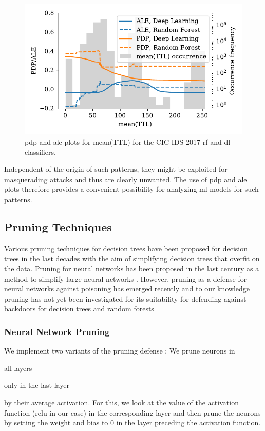 \documentclass[10pt,sigconf,letterpaper,dvipsnames]{acmart}
\begin{document}
\begin{figure}[b]
\includegraphics[width=\columnwidth]{figures/ttlmean.pdf}
\caption{\gls{pdp} and \gls{ale} plots for mean(TTL) for the CIC-IDS-2017 \gls{rf} and \gls{dl} classifiers.}
\label{fig:ttlmean}
\end{figure}
Independent of the origin of such patterns, they might be exploited for masquerading attacks and thus are clearly unwanted. The use of \gls{pdp} and \gls{ale} plots therefore provides a convenient possibility for analyzing \gls{ml} models for such patterns.
\subsection{Pruning Techniques}

Various pruning techniques for decision trees have been proposed for decision trees in the last decades \cite{esposito_comparative_1997} with the aim of simplifying decision trees that overfit on the data. Pruning for neural networks has been proposed in the last century as a method to simplify large neural networks \cite{sietsma_neural_1988}. However, pruning as a defense for neural networks against poisoning has emerged recently \cite{gu_badnets:_2017} and to our knowledge pruning has not yet been investigated for its suitability for defending against backdoors for decision trees and random forests

\subsubsection{Neural Network Pruning}

We implement two variants of the pruning defense \cite{gu_badnets:_2017}: We prune neurons in \begin{enumerate*}\item all layers \item only in the last layer \end{enumerate*} by their average activation. For this, we look at the value of the activation function (\gls{relu} in our case) in the corresponding layer and then prune the neurons by setting the weight and bias to 0 in the layer preceding the activation function. 
\end{document}
